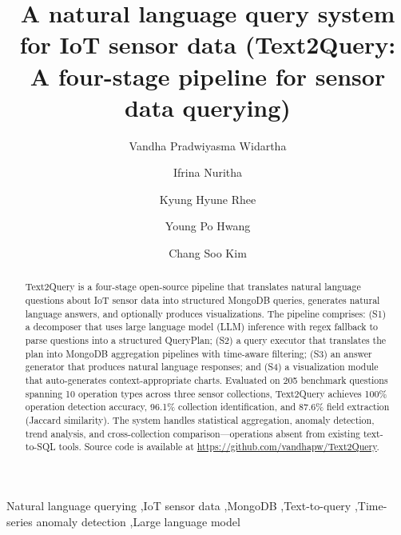 \documentclass[preprint,12pt,a4paper]{elsarticle}
\begin{document}
\begin{frontmatter}

\title{A natural language query system for IoT sensor data (Text2Query: A four-stage pipeline for sensor data querying)}

\author[A]{Vandha Pradwiyasma Widartha}
\author[B]{Ifrina Nuritha}
\author[C]{Kyung Hyune Rhee}
\author[D]{Young Po Hwang}
\author[A]{Chang Soo Kim}

\address[A]{Department of Information Systems, Pukyong National University, Busan 48513, Republic of Korea}
\address[B]{Department of Information System, University of Jember, Jember 68121, Indonesia}
\address[C]{Division of Computer Engineering and AI, Pukyong National University, Busan 48513, Republic of Korea}
\address[D]{Research Center, Hanyoung DS, Inc., Seoul 07600, Republic of Korea}


\begin{abstract}
Text2Query is a four-stage open-source pipeline that translates natural language questions about IoT sensor data into structured MongoDB queries, generates natural language answers, and optionally produces visualizations. The pipeline comprises: (S1) a decomposer that uses large language model (LLM) inference with regex fallback to parse questions into a structured QueryPlan; (S2) a query executor that translates the plan into MongoDB aggregation pipelines with time-aware filtering; (S3) an answer generator that produces natural language responses; and (S4) a visualization module that auto-generates context-appropriate charts. Evaluated on 205 benchmark questions spanning 10 operation types across three sensor collections, Text2Query achieves 100\% operation detection accuracy, 96.1\% collection identification, and 87.6\% field extraction (Jaccard similarity). The system handles statistical aggregation, anomaly detection, trend analysis, and cross-collection comparison---operations absent from existing text-to-SQL tools. Source code is available at \url{https://github.com/vandhapw/Text2Query}.
\end{abstract}

\begin{keyword}
Natural language querying \sep IoT sensor data \sep MongoDB \sep Text-to-query \sep Time-series anomaly detection \sep Large language model
\end{keyword}

\end{frontmatter}
\end{document}
